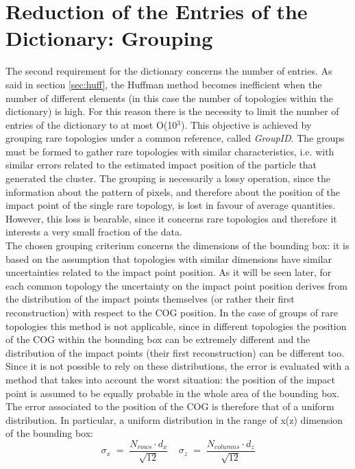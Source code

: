 \section{Reduction of the Entries of the Dictionary: Grouping}
\label{sec:group}
The second requirement for the dictionary concerns the number of entries. As said in section \ref{sec:huff}, the Huffman method becomes inefficient when the number of different elements (in this case the number of topologies within the dictionary) is high. For this reason there is the necessity to limit the number of entries of the dictionary to at most O(10$^3$). This objective is achieved by grouping rare topologies under a common reference, called \textit{GroupID}. The groups must be formed to gather rare topologies with similar characteristics, i.e. with similar errors related to the estimated impact position of the particle that generated the cluster. The grouping is necessarily a lossy operation, since the information about the pattern of pixels, and therefore about the position of the impact point of the single rare topology, is lost in favour of average quantities. However, this loss is bearable, since it concerns rare topologies and therefore it interests a very small fraction of the data.\\
The chosen grouping criterium concerns the dimensions of the bounding box: it is based on the assumption that topologies with similar dimensions have similar uncertainties related to the impact point position. As it will be seen later, for each common topology the uncertainty on the impact point position derives from the distribution of the impact points themselves (or rather their first reconstruction) with respect to the COG position. In the case of groups of rare topologies this method is not applicable, since in different topologies the position of the COG within the bounding box can be extremely different and the distribution of the impact points (their first reconstruction) can be different too. Since it is not possible to rely on these distributions, the error is evaluated with a method that takes into account the worst situation: the position of the impact point is assumed to be equally probable in the whole area of the bounding box. The error associated to the position of the COG is therefore that of a uniform distribution. In particular, a uniform distribution in the range of x(z) dimension of the bounding box:
\begin{equation}
 \sigma_x \; = \; \frac{N_{rows} \cdot d_x}{\sqrt{12}} \ \ \ \ \  \sigma_z \; = \; \frac{N_{columns} \cdot d_z}{\sqrt{12}}
\end{equation}
